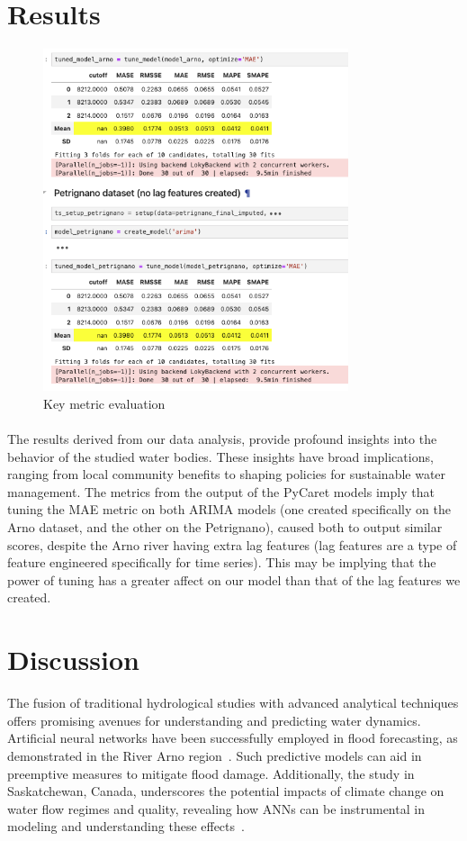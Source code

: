 \documentclass{article}
\begin{document}
\section{Results}
\begin{figure}[h]
\centering
\includegraphics[width=0.8\textwidth]{metrics.png}
\caption{Key metric evaluation}
\end{figure}
\paragraph{\textbf{}}
The results derived from our data analysis, provide profound insights into the behavior of the studied water bodies. These insights have broad implications, ranging from local community benefits to shaping policies for sustainable water management. The metrics from the output of the PyCaret models imply that tuning the MAE metric on both ARIMA models (one created specifically on the Arno dataset, and the other on the Petrignano), caused both to output similar scores, despite the Arno river having extra lag features (lag features are a type of feature engineered specifically for time series). This may be implying that the power of tuning has a greater affect on our model than that of the lag features we created.

\section{Discussion}
The fusion of traditional hydrological studies with advanced analytical techniques offers promising avenues for understanding and predicting water dynamics. Artificial neural networks have been successfully employed in flood forecasting, as demonstrated in the River Arno region~\cite{arno_paper}. Such predictive models can aid in preemptive measures to mitigate flood damage. Additionally, the study in Saskatchewan, Canada, underscores the potential impacts of climate change on water flow regimes and quality, revealing how ANNs can be instrumental in modeling and understanding these effects~\cite{canada_paper}.
\end{document}
